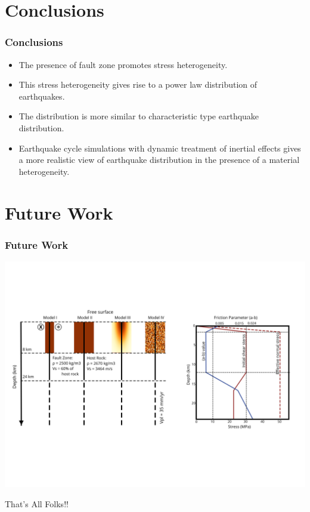 \documentclass{beamer}
\begin{document}
\section{Conclusions}
\begin{frame}
    \frametitle{Conclusions}
    \begin{itemize}
        \item The presence of fault zone promotes stress heterogeneity.
        \item This stress heterogeneity gives rise to a power law distribution of earthquakes.
        \item The distribution is more similar to characteristic type earthquake distribution.
        \item Earthquake cycle simulations with dynamic treatment of inertial effects gives a more realistic view of earthquake distribution in the presence of a material heterogeneity.
        \end{itemize}
\end{frame}

\section{Future Work}
\begin{frame}
    \frametitle{Future Work}
    \includegraphics[width=\textwidth]{images/model_setup_scec.png} 
\end{frame}

\begin{frame}
    \Huge{\centerline{That's All Folks!!}}
\end{frame}
\end{document}
